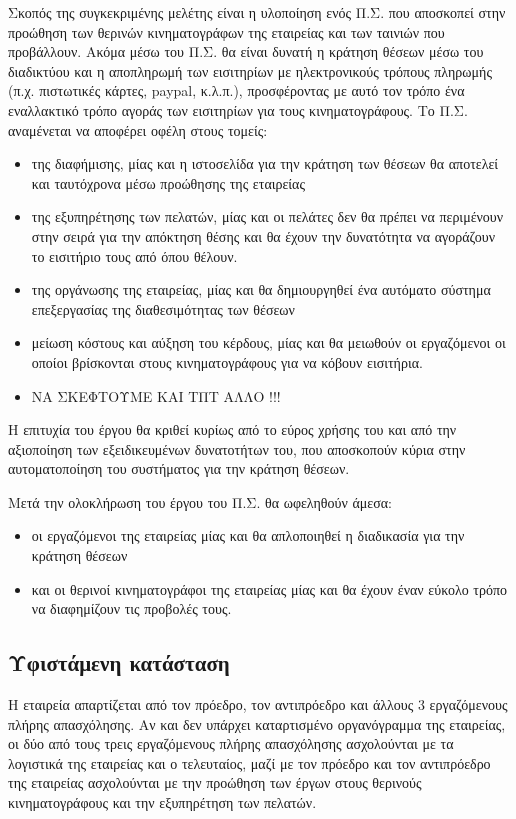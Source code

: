 \documentclass{assignment}
\begin{document}
Σκοπός της συγκεκριμένης μελέτης είναι η υλοποίηση ενός Π.Σ. που αποσκοπεί στην προώθηση των θερινών κινηματογράφων της εταιρείας και των ταινιών που προβάλλουν. Ακόμα μέσω του Π.Σ. θα είναι δυνατή η κράτηση θέσεων μέσω του διαδικτύου και η αποπληρωμή των εισιτηρίων με ηλεκτρονικούς τρόπους πληρωμής (π.χ. πιστωτικές κάρτες, paypal, κ.λ.π.), προσφέροντας με αυτό τον τρόπο ένα εναλλακτικό τρόπο αγοράς των εισιτηρίων για τους κινηματογράφους. Το Π.Σ. αναμένεται να αποφέρει οφέλη στους τομείς:

\begin{itemize}
\item της διαφήμισης, μίας και η ιστοσελίδα για την κράτηση των θέσεων θα αποτελεί και ταυτόχρονα μέσω προώθησης της εταιρείας
\item της εξυπηρέτησης των πελατών, μίας και οι πελάτες δεν θα πρέπει να περιμένουν στην σειρά για την απόκτηση θέσης και θα έχουν την δυνατότητα να αγοράζουν το εισιτήριο τους από όπου θέλουν.
\item της οργάνωσης της εταιρείας, μίας και θα δημιουργηθεί ένα αυτόματο σύστημα επεξεργασίας της διαθεσιμότητας των θέσεων
\item μείωση κόστους και αύξηση του κέρδους, μίας και θα μειωθούν οι εργαζόμενοι οι οποίοι βρίσκονται στους κινηματογράφους για να κόβουν εισιτήρια. 
\item ΝΑ ΣΚΕΦΤΟΥΜΕ ΚΑΙ ΤΠΤ ΑΛΛΟ !!!
\end{itemize}

Η επιτυχία του έργου θα κριθεί κυρίως από το εύρος χρήσης του και από την αξιοποίηση των εξειδικευμένων δυνατοτήτων του, που αποσκοπούν κύρια στην αυτοματοποίηση του συστήματος για την κράτηση θέσεων.

Μετά την ολοκλήρωση του έργου του Π.Σ. θα ωφεληθούν άμεσα:

\begin{itemize}
\item οι εργαζόμενοι της εταιρείας μίας και θα απλοποιηθεί η διαδικασία για την κράτηση θέσεων
\item και οι θερινοί κινηματογράφοι της εταιρείας μίας και θα έχουν έναν εύκολο τρόπο να διαφημίζουν τις προβολές τους.
\end{itemize}

\subsection{Υφιστάμενη κατάσταση}

Η εταιρεία απαρτίζεται από τον πρόεδρο, τον αντιπρόεδρο και άλλους 3 εργαζόμενους πλήρης απασχόλησης. Αν και δεν υπάρχει καταρτισμένο οργανόγραμμα της εταιρείας, οι δύο από τους τρεις εργαζόμενους πλήρης απασχόλησης ασχολούνται με τα λογιστικά της εταιρείας και ο τελευταίος, μαζί με τον πρόεδρο και τον αντιπρόεδρο της εταιρείας ασχολούνται με την προώθηση των έργων στους θερινούς κινηματογράφους και την εξυπηρέτηση των πελατών.
\end{document}
